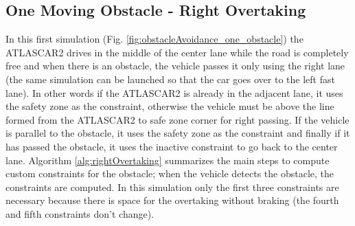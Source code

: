 \subsection{One Moving Obstacle - Right Overtaking}
In this first simulation
(Fig. \ref{fig:obstacleAvoidance_one_obstacle}) the ATLASCAR2 drives in the middle of the center lane while the road is completely free and when there is an obstacle, the vehicle passes it only using the right lane (the same simulation can be launched so that the car goes over to the left fast lane). In other words if the ATLASCAR2 is already in the adjacent lane, it uses the safety zone as the constraint, otherwise the vehicle must be above the line formed from the ATLASCAR2 to safe zone corner for right passing. If the vehicle is parallel to the obstacle, it  uses the safety zone as the constraint and finally if it has passed the obstacle, it uses the inactive constraint to go back to the center lane.
Algorithm \ref{alg:rightOvertaking} summarizes the main steps to compute custom constraints for the obstacle; when the vehicle detects the obstacle, the constraints are computed. In this simulation only the first three constraints are necessary because there is space for the overtaking without braking (the fourth and fifth constraints don't change).

